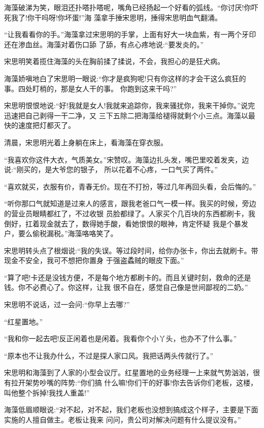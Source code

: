 \documentclass[11pt,a4paper,onecolumn]{article}
\begin{document}
海藻破涕为笑，眼泪还扑嗒扑嗒呢，嘴角已经扬起一个好看的弧线。``你讨厌!你吓死我了!你干吗呀!你坏蛋!''海
藻拿手捶宋思明，捶得宋思明血气翻涌。

``让我看看你的手。''海藻拿过宋思明的手掌，上面有好大一块血紫，有一两个牙印还在渗血丝。海藻对着伤口舔
了舔，有点心疼地说:``要发炎的。''

宋思明笑着揽住海藻的头在胸前揉了揉说，不会，我担心的是狂犬病。

海藻娇嗔地白了宋思明一眼说:``你才是疯狗呢!只有你这样的才会干这么疯狂的事。四处盯梢的，那是女人干的事。
你跑到这来干吗?''

宋思明恨恨地说:``好!我就是女人!我就来追踪你，我来骚扰你，我来干掉你。''说完迅速把自己剥得一干二净，又
三下五除二把海藻给褪得就剩个小三点。海藻以最快的速度把灯都灭了。

清晨，宋思明光着上身躺在床上，看海藻在穿衣服。

``我喜欢你这件大衣，气质美女。''宋赞叹。海藻边扎头发，嘴巴里咬着发夹，边说:``刚买的，是大爷您的银子，
所以花着不心疼，一口气买了两件。''

``喜欢就买，衣服有价，青春无价。现在不打扮，等过几年再回头看，会后悔的。''

``听你那口气就知道是过来人的感言，跟我老爸口气一模一样。我买的时候，旁边的营业员眼睛都红了，不过收银
员脸都绿了。人家买个几百块的东西都刷卡，我倒好，扛着现金就去了，数得她手酸，看她恨恨的眼神，肯定怀疑
我是个暴发户，要么偷税漏税。''海藻咯咯笑了。

宋思明转头点了根烟说:``我的失误。等过段时间，给你办张卡，你出去就刷卡。带现金不安全，我可不想把你置身
于强盗蟊贼的眼皮下面。''

``算了吧!卡还是没钱方便，不是每个地方都刷卡的。而且关键时刻，救命的还是钱。你不必费心了。你这样，让我
很不自在，感觉自己像是世间鄙视的二奶。''

宋思明不说话，过一会问:``你早上去哪?''

``红星置地。''

``我和你一起去吧!反正闲着也是闲着。我看你个小丫头，也办不了什么事。''

``原本也不让我办什么，不过是探人家口风。我把话两头传就行了。''

宋思明和海藻到了人家的小型会议厅。红星置地的业务经理一上来就气势汹汹，很有拉开架势吵嘴的阵势:``你们搞
什么嘛!你们干的好事!你去告诉你们老板，这楼，叫他整个拆掉!我找人重盖!''

海藻低眉顺眼说:``对不起，对不起，我们老板也没想到搞成这个样子，主要是下面实施的人擅自做主。老板让我来
问问，贵公司对解决问题有什么提议没有。''
\end{document}
